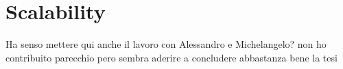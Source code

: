 
\chapter{Scalability}
\label{chap:9_scalability}
	\graphicspath{{Chapter9/}}
Ha senso mettere qui anche il lavoro con Alessandro e Michelangelo? non ho contribuito parecchio pero sembra aderire a concludere abbastanza bene la tesi


